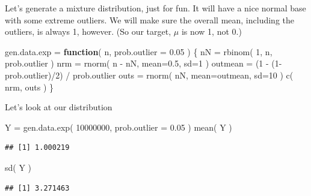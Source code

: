 \documentclass[
]{book}
\newenvironment{Shaded}{\begin{snugshade}}{\end{snugshade}}
\newcommand{\AttributeTok}[1]{\textcolor[rgb]{0.77,0.63,0.00}{#1}}
\newcommand{\ControlFlowTok}[1]{\textcolor[rgb]{0.13,0.29,0.53}{\textbf{#1}}}
\newcommand{\DecValTok}[1]{\textcolor[rgb]{0.00,0.00,0.81}{#1}}
\newcommand{\FloatTok}[1]{\textcolor[rgb]{0.00,0.00,0.81}{#1}}
\newcommand{\FunctionTok}[1]{\textcolor[rgb]{0.00,0.00,0.00}{#1}}
\newcommand{\NormalTok}[1]{#1}
\newcommand{\OtherTok}[1]{\textcolor[rgb]{0.56,0.35,0.01}{#1}}
\newcommand{\SpecialCharTok}[1]{\textcolor[rgb]{0.00,0.00,0.00}{#1}}
\begin{document}
Let's generate a mixture distribution, just for fun. It will have a nice
normal base with some extreme outliers. We will make sure the overall mean,
including the outliers, is always 1, however. (So our target, \(\mu\) is now 1,
not 0.)

\begin{Shaded}
\begin{Highlighting}[]
\NormalTok{gen.data.exp }\OtherTok{=} \ControlFlowTok{function}\NormalTok{( n, }\AttributeTok{prob.outlier =} \FloatTok{0.05}\NormalTok{ ) \{}
\NormalTok{    nN }\OtherTok{=} \FunctionTok{rbinom}\NormalTok{( }\DecValTok{1}\NormalTok{, n, prob.outlier )}
\NormalTok{    nrm }\OtherTok{=} \FunctionTok{rnorm}\NormalTok{( n }\SpecialCharTok{{-}}\NormalTok{ nN, }\AttributeTok{mean=}\FloatTok{0.5}\NormalTok{, }\AttributeTok{sd=}\DecValTok{1}\NormalTok{ )}
\NormalTok{    outmean }\OtherTok{=}\NormalTok{ (}\DecValTok{1} \SpecialCharTok{{-}}\NormalTok{ (}\DecValTok{1}\SpecialCharTok{{-}}\NormalTok{prob.outlier)}\SpecialCharTok{/}\DecValTok{2}\NormalTok{) }\SpecialCharTok{/}\NormalTok{ prob.outlier}
\NormalTok{    outs }\OtherTok{=} \FunctionTok{rnorm}\NormalTok{( nN, }\AttributeTok{mean=}\NormalTok{outmean, }\AttributeTok{sd=}\DecValTok{10}\NormalTok{ )}
    \FunctionTok{c}\NormalTok{( nrm, outs )}
\NormalTok{\}}
\end{Highlighting}
\end{Shaded}

Let's look at our distribution

\begin{Shaded}
\begin{Highlighting}[]
\NormalTok{Y }\OtherTok{=} \FunctionTok{gen.data.exp}\NormalTok{( }\DecValTok{10000000}\NormalTok{, }\AttributeTok{prob.outlier =} \FloatTok{0.05}\NormalTok{ )}
\FunctionTok{mean}\NormalTok{( Y )}
\end{Highlighting}
\end{Shaded}

\begin{verbatim}
## [1] 1.000219
\end{verbatim}

\begin{Shaded}
\begin{Highlighting}[]
\FunctionTok{sd}\NormalTok{( Y )}
\end{Highlighting}
\end{Shaded}

\begin{verbatim}
## [1] 3.271463
\end{verbatim}
\end{document}
